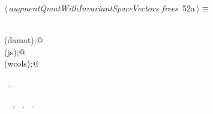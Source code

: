 \documentclass{article}
\begin{document}
\begin{flushleft} \small
\begin{minipage}{\linewidth}\label{scrap74}\raggedright\small
{} $\langle\,${\itshape augmentQmatWithInvariantSpaceVectors frees}\nobreak\ {\footnotesize {52a}}$\,\rangle\equiv$
\vspace{-1ex}
\begin{list}{}{} \item
\mbox{}\verb@@\\
\mbox{}\verb@free(damat);@\\
\mbox{}\verb@free(js);@\\
\mbox{}\verb@free(wcols);@\\
\mbox{}\verb@@{\NWsep}
\end{list}
\vspace{-1.5ex}
\footnotesize
\begin{list}{}{\setlength{\itemsep}{-\parsep}\setlength{\itemindent}{-\leftmargin}}
\item \NWtxtMacroRefIn\ .
\item \NWtxtIdentsUsed\nobreak\  \verb@damat@\nobreak\ , \verb@js@\nobreak\ , \verb@wcols@\nobreak\ .
\item{}
\end{list}
\end{minipage}\vspace{4ex}
\end{flushleft}
\end{document}
